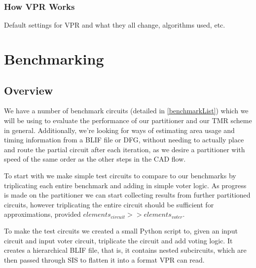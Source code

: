 \documentclass[12pt,drafta4paper,oneside]{memoir} %
\begin{document}
\subsection{How VPR Works}
Default settings for VPR and what they all change, algorithms used, etc.

\chapter{Benchmarking}
\section{Overview}
We have a number of benchmark circuits (detailed in \ref{benchmarkList}) which we will be using to evaluate the performance of our partitioner and our \ac{TMR} scheme in general.
Additionally, we're looking for ways of estimating area usage and timing information from a \ac{BLIF} file or \ac{DFG}, without needing to actually place and route the partial circuit after each iteration, as we desire a partitioner with speed of the same order as the other steps in the \ac{CAD} flow.

To start with we make simple test circuits to compare to our benchmarks by triplicating each entire benchmark and adding in simple voter logic. As progress is made on the partitioner we can start collecting results from further partitioned circuits, however triplicating the entire circuit should be sufficient for approximations, provided $elements_{circuit} >> elements_{voter}$.

To make the test circuits we created a small Python script to, given an input circuit and input voter circuit, triplicate the circuit and add voting logic. It creates a hierarchical \ac{BLIF} file, that is, it contains nested subcircuits, which are then passed through \ac{SIS} to flatten it into a format \ac{VPR} can read.
\end{document}
